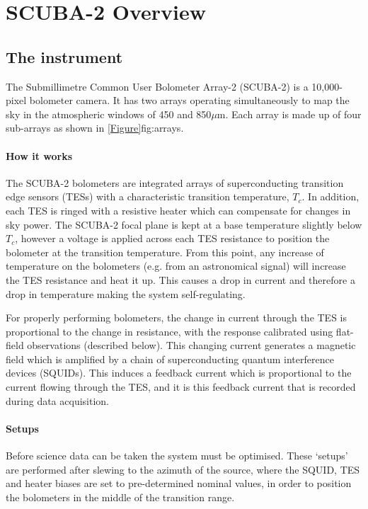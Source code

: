 \chapter{SCUBA-2 Overview}
\label{sec:s2}
\section{The instrument}


The Submillimetre Common User Bolometer Array-2 (SCUBA-2) is a
10,000-pixel bolometer camera. It has two arrays operating
simultaneously to map the sky in the atmospheric windows of 450 and
850$\mu$m. Each array is made up of four sub-arrays as shown in
\cref{Figure}{fig:arrays}{}.

\subsubsection*{How it works}
The SCUBA-2 bolometers are integrated arrays of superconducting
transition edge sensors (TESs) with a characteristic transition
temperature, $T_c$. In addition, each TES is ringed with a resistive
heater which can compensate for changes in sky power. The SCUBA-2
focal plane is kept at a base temperature slightly below $T_c$,
however a voltage is applied across each TES resistance to position
the bolometer at the transition temperature. From this point, any
increase of temperature on the bolometers (e.g. from an astronomical
signal) will increase the TES resistance and heat it up. This causes a
drop in current and therefore a drop in temperature making the system
self-regulating.

For properly performing bolometers, the change in current through the
TES is proportional to the change in resistance, with the response
calibrated using flat-field observations (described below). This
changing current generates a magnetic field which is amplified by a
chain of superconducting quantum interference devices (SQUIDs). This
induces a feedback current which is proportional to the current
flowing through the TES, and it is this feedback current that is
recorded during data acquisition.


\subsubsection*{Setups}

Before science data can be taken the system must be optimised. These
`setups' are performed after slewing to the azimuth of the source,
where the SQUID, TES and heater biases are set to pre-determined
nominal values, in order to position the bolometers in the middle of
the transition range.

